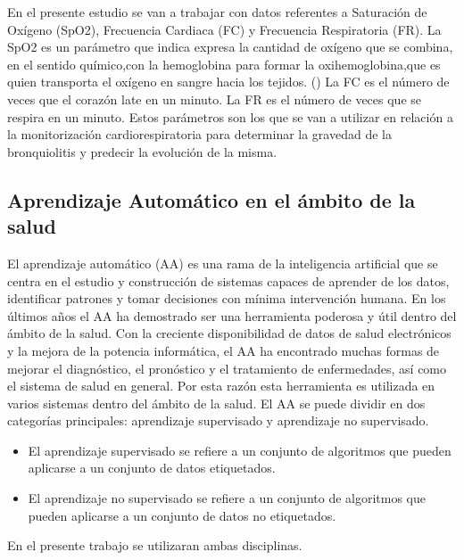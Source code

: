 En el presente estudio se van a trabajar con datos referentes a Saturación de Oxígeno (SpO2), Frecuencia Cardiaca (FC) y Frecuencia Respiratoria (FR). La SpO2 es un parámetro que indica expresa la cantidad de oxígeno que se combina, en el sentido químico,con la hemoglobina para formar la oxihemoglobina,que es quien transporta el oxígeno en sangre hacia los tejidos. (\cite{Laborde2004}) La FC es el número de veces que el corazón late en un minuto. La FR es el número de veces que se respira en un minuto. Estos parámetros son los que se van a utilizar en relación a la monitorización cardiorespiratoria para determinar la gravedad de la bronquiolitis y predecir la evolución de la misma.


\subsection{Aprendizaje Automático en el ámbito de la salud}

El aprendizaje automático (AA) es una rama de la inteligencia artificial que se centra en el estudio y construcción de sistemas capaces de aprender de los datos, identificar patrones y tomar decisiones con mínima intervención humana. En los últimos años el AA ha demostrado ser una herramienta poderosa y útil dentro del ámbito de la salud. Con la creciente disponibilidad de datos de salud electrónicos y la mejora de la potencia informática, el AA ha encontrado muchas formas de mejorar el diagnóstico, el pronóstico y el tratamiento de enfermedades, así como el sistema de salud en general. Por esta razón esta herramienta es utilizada en varios sistemas dentro del ámbito de la salud. El AA se puede dividir en dos categorías principales: aprendizaje supervisado y aprendizaje no supervisado.

\begin{itemize}
    \item El aprendizaje supervisado se refiere a un conjunto de algoritmos que pueden aplicarse a un conjunto de datos etiquetados. 
    \item El aprendizaje no supervisado se refiere a un conjunto de algoritmos que pueden aplicarse a un conjunto de datos no etiquetados.
\end{itemize}

En el presente trabajo se utilizaran ambas disciplinas.











